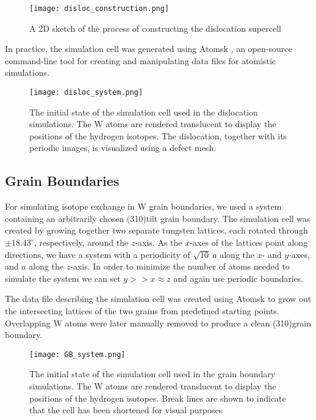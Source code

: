 \begin{figure}[!ht]
\center
\texttt{[image: disloc\_construction.png]}
\caption{A 2D sketch of the process of constructing the dislocation supercell}
\label{Fig:disloc_construction}
\end{figure}

In practice, the simulation cell was generated using Atomsk \cite{hirel2015atomsk}, an open-source command-line tool for creating and manipulating data files for atomistic simulations. 

\begin{figure}[!ht]
\center
\texttt{[image: disloc\_system.png]}
\caption{The initial state of the simulation cell used in the dislocation simulations. 
The W atoms are rendered translucent to display the positions of the hydrogen isotopes. 
The dislocation, together with its periodic images, is visualized using a defect mesh.}
\label{Fig:disloc_system}
\end{figure}

\subsection{Grain Boundaries}
For simulating isotope exchange in W grain boundaries, we used a system containing an arbitrarily chosen \hkl(310)\hkl[001] tilt grain boundary. 
The simulation cell was created by growing together two separate tungsten lattices, each rotated through $\pm18.43^\circ$, respectively, around the $z$-axis. 
As the $x$-axes of the lattices point along  directions, we have a system with a periodicity of $\sqrt{10}~a$ along the $x$- and $y$-axes, and $a$ along the $z$-axis. 
In order to minimize the number of atoms needed to simulate the system we can set $y >> x \approx z$ and again use periodic boundaries.


The data file describing the simulation cell was created using Atomsk \cite{hirel2015atomsk} to grow out the intersecting lattices of the two grains from predefined starting points. 
Overlapping W atoms were later manually removed to produce a clean \hkl(310)\hkl[001] grain boundary.

\begin{figure}[!ht]
\center
\texttt{[image: GB\_system.png]}
\caption{The initial state of the simulation cell used in the grain boundary simulations. 
The W atoms are rendered translucent to display the positions of the hydrogen isotopes. Break lines are shown to indicate that the cell has been shortened for visual purposes}
\label{Fig:GB_system}
\end{figure}


